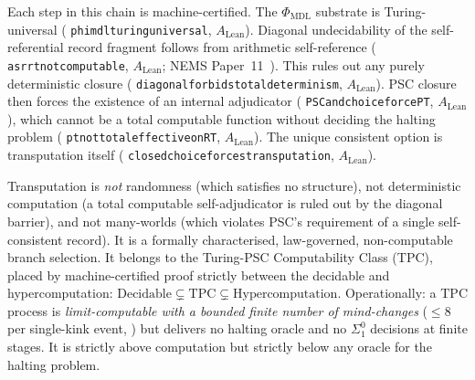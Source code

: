 \documentclass[11pt]{article}
\theoremstyle{remark}
\newcommand{\PHIMDL}{\Phi_{\mathrm{MDL}}}
\newcommand{\lean}[1]{%
  \penalty-100
  \begingroup\def\_{\textunderscore\allowbreak}\texttt{#1}\endgroup}
\begin{document}
\begin{center}
\end{center}

\medskip
Each step in this chain is machine-certified. The $\PHIMDL$ substrate is Turing-universal
(\lean{phimdl\_turing\_universal}, $A_\text{Lean}$). Diagonal undecidability of the
self-referential record fragment follows from arithmetic self-reference
(\lean{asr\_rt\_not\_computable}, $A_\text{Lean}$; NEMS Paper~11~\cite{SpivackNEMS11}).
This rules out any purely deterministic closure (\lean{diagonal\_forbids\allowbreak\_total\_determinism}, $A_\text{Lean}$).
PSC closure then forces the existence of an internal adjudicator
(\lean{PSC\_and\_choice\_force\_PT}, $A_\text{Lean}$), which cannot be a total computable
function without deciding the halting problem (\lean{pt\_not\_total\allowbreak\_effective\_on\_RT},
$A_\text{Lean}$). The unique consistent option is transputation itself
(\lean{closed\_choice\_forces\_transputation}, $A_\text{Lean}$).

\medskip

Transputation is \emph{not} randomness (which satisfies no structure), not deterministic
computation (a total computable self-adjudicator is ruled out by the diagonal barrier),
and not many-worlds (which violates PSC's
requirement of a single self-consistent record). It is a formally characterised,
law-governed, non-computable branch selection. It belongs to the Turing-PSC
Computability Class (TPC), placed by machine-certified proof strictly between the
decidable and hypercomputation:
$\text{Decidable} \subsetneq \text{TPC} \subsetneq \text{Hypercomputation}$.
Operationally: a TPC process is \emph{limit-computable with a bounded finite number of
mind-changes} ($\leq 8$ per single-kink event,
\cite{SpivackPolynomialTransputation,SpivackGTECompleteFramework}) but delivers no
halting oracle and no $\Sigma^0_1$ decisions at finite stages. It is strictly above computation but
strictly below any oracle for the halting problem.
\end{document}
